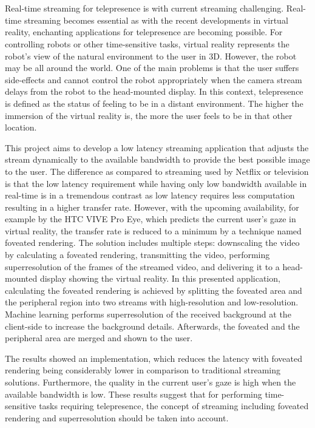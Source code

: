 \chapter{\abstractname}
Real-time streaming for telepresence is with current streaming challenging. Real-time streaming becomes essential as with the recent developments in virtual reality, enchanting applications for telepresence are becoming possible. For controlling robots or other time-sensitive tasks, virtual reality represents the robot's view of the natural environment to the user in 3D. However, the robot may be all around the world. One of the main problems is that the user suffers side-effects and cannot control the robot appropriately when the camera stream delays from the robot to the head-mounted display. In this context, telepresence is defined as the status of feeling to be in a distant environment. The higher the immersion of the virtual reality is, the more the user feels to be in that other location. 
\par
This project aims to develop a low latency streaming application that adjusts the stream dynamically to the available bandwidth to provide the best possible image to the user. The difference as compared to streaming used by Netflix or television is that the low latency requirement while having only low bandwidth available in real-time is in a tremendous contrast as low latency requires less computation resulting in a higher transfer rate. However, with the upcoming availability, for example by the HTC VIVE Pro Eye, which predicts the current user's gaze in virtual reality, the transfer rate is reduced to a minimum by a technique named foveated rendering. The solution includes multiple steps: downscaling the video by calculating a foveated rendering, transmitting the video, performing superresolution of the frames of the streamed video, and delivering it to a head-mounted display showing the virtual reality. In this presented application, calculating the foveated rendering is achieved by splitting the foveated area and the peripheral region into two streams with high-resolution and low-resolution. Machine learning performs superresolution of the received background at the client-side to increase the background details. Afterwards, the foveated and the peripheral area are merged and shown to the user. 
\par
The results showed an implementation, which reduces the latency with foveated rendering being considerably lower in comparison to traditional streaming solutions. Furthermore, the quality in the current user's gaze is high when the available bandwidth is low. These results suggest that for performing time-sensitive tasks requiring telepresence, the concept of streaming including foveated rendering and superresolution should be taken into account.